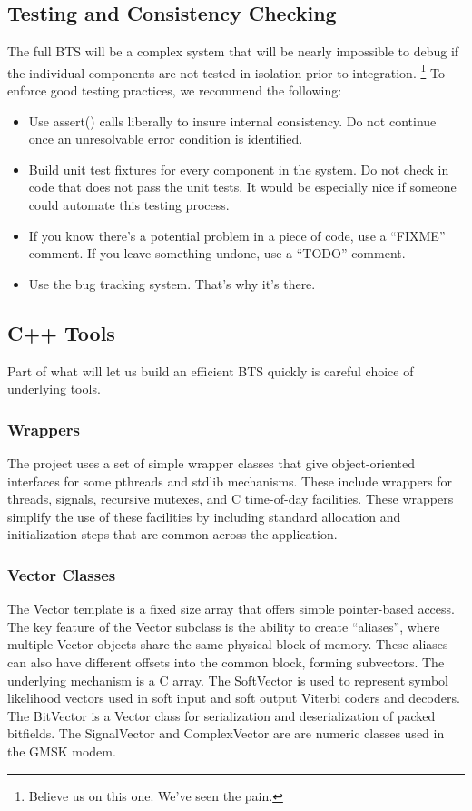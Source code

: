 \documentclass[11pt]{book}
\begin{document}
\subsection{Testing and Consistency Checking}
The full BTS will be a complex system that will be nearly impossible to debug if the individual components are not tested in isolation prior to integration.%
\footnote{Believe us on this one.  We've seen the pain.}
To enforce good testing practices, we recommend the following:
\begin{itemize}
	\item Use assert() calls liberally to insure internal consistency.  Do not continue once an unresolvable error condition is identified.
	\item Build unit test fixtures for every component in the system.  Do not check in code that does not pass the unit tests.  It would be especially nice if someone could automate this testing process.
	\item If you know there's a potential problem in a piece of code, use a ``FIXME'' comment.  If you leave something undone, use a ``TODO'' comment.
	\item Use the bug tracking system.  That's why it's there.
\end{itemize}


\subsection{C++ Tools}
Part of what will let us build an efficient BTS quickly is careful choice of underlying tools.

\subsubsection{Wrappers}
The project uses a set of simple wrapper classes that give object-oriented interfaces for some pthreads and stdlib mechanisms.  These include wrappers for threads, signals, recursive mutexes, and C time-of-day facilities.  These wrappers simplify the use of these facilities by including standard allocation and initialization steps that are common across the application.

\subsubsection{Vector Classes}
The Vector template is a fixed size array that offers simple pointer-based access.  The key feature of the Vector subclass is the ability to create ``aliases'', where multiple Vector objects share the same physical block of memory.  These aliases can also have different offsets into the common block, forming subvectors.  The underlying mechanism is a C array.  The SoftVector is used to represent symbol likelihood vectors used in soft input and soft output Viterbi coders and decoders.  The BitVector is a Vector class for serialization and deserialization of packed bitfields.  The SignalVector and ComplexVector are are numeric classes used in the GMSK modem.
\end{document}
